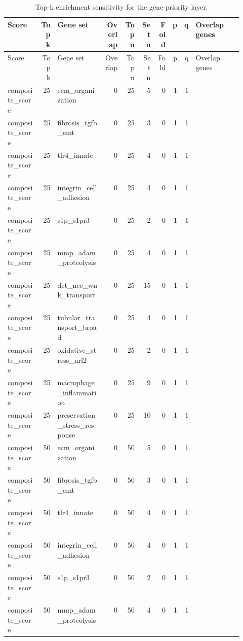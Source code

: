 \documentclass[11pt]{article}
\begin{document}
\begin{landscape}
\scriptsize
\setlength{\tabcolsep}{3pt}
\begin{longtable}{p{0.14\linewidth}rp{0.20\linewidth}rrrrrrp{0.20\linewidth}}
\caption{Top-k enrichment sensitivity for the gene-priority layer.}\\
\toprule
Score & Top k & Gene set & Overlap & Top n & Set n & Fold & p & q & Overlap genes \\
\midrule
\endfirsthead
\toprule
Score & Top k & Gene set & Overlap & Top n & Set n & Fold & p & q & Overlap genes \\
\midrule
\endhead
composite\_score & 25 & ecm\_organization & 0 & 25 & 5 & 0 & 1 & 1 &  \\
composite\_score & 25 & fibrosis\_tgfb\_emt & 0 & 25 & 3 & 0 & 1 & 1 &  \\
composite\_score & 25 & tlr4\_innate & 0 & 25 & 4 & 0 & 1 & 1 &  \\
composite\_score & 25 & integrin\_cell\_adhesion & 0 & 25 & 4 & 0 & 1 & 1 &  \\
composite\_score & 25 & s1p\_s1pr3 & 0 & 25 & 2 & 0 & 1 & 1 &  \\
composite\_score & 25 & mmp\_adam\_proteolysis & 0 & 25 & 4 & 0 & 1 & 1 &  \\
composite\_score & 25 & dct\_ncc\_wnk\_transport & 0 & 25 & 15 & 0 & 1 & 1 &  \\
composite\_score & 25 & tubular\_transport\_broad & 0 & 25 & 4 & 0 & 1 & 1 &  \\
composite\_score & 25 & oxidative\_stress\_nrf2 & 0 & 25 & 2 & 0 & 1 & 1 &  \\
composite\_score & 25 & macrophage\_inflammation & 0 & 25 & 9 & 0 & 1 & 1 &  \\
composite\_score & 25 & preservation\_stress\_response & 0 & 25 & 10 & 0 & 1 & 1 &  \\
composite\_score & 50 & ecm\_organization & 0 & 50 & 5 & 0 & 1 & 1 &  \\
composite\_score & 50 & fibrosis\_tgfb\_emt & 0 & 50 & 3 & 0 & 1 & 1 &  \\
composite\_score & 50 & tlr4\_innate & 0 & 50 & 4 & 0 & 1 & 1 &  \\
composite\_score & 50 & integrin\_cell\_adhesion & 0 & 50 & 4 & 0 & 1 & 1 &  \\
composite\_score & 50 & s1p\_s1pr3 & 0 & 50 & 2 & 0 & 1 & 1 &  \\
composite\_score & 50 & mmp\_adam\_proteolysis & 0 & 50 & 4 & 0 & 1 & 1 &  \\

\end{longtable}
\end{landscape}
\end{document}
